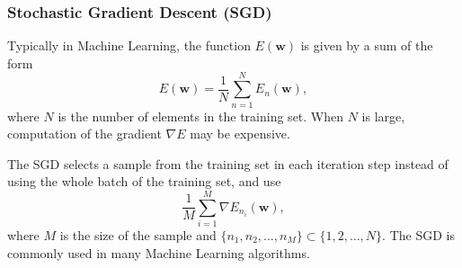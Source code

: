 \documentclass[
]{article}
\begin{document}
\hypertarget{stochastic-gradient-descent-sgd}{%
\subsubsection{Stochastic Gradient Descent
(SGD)}\label{stochastic-gradient-descent-sgd}}

Typically in Machine Learning, the function \(E({\boldsymbol{w}})\) is
given by a sum of the form
\[ E({\boldsymbol{w}}) = \frac 1 N \sum_{n=1}^N E_n({\boldsymbol{w}}), \]
where \(N\) is the number of elements in the training set. When \(N\) is
large, computation of the gradient \(\nabla E\) may be expensive.

The SGD selects a sample from the training set in each iteration step
instead of using the whole batch of the training set, and use
\[ \frac 1 M \sum_{i=1}^M \nabla E_{n_i}({\boldsymbol{w}}) ,\] where
\(M\) is the size of the sample and
\(\{ n_1, n_2 , \dots , n_M \} \subset \{ 1,2, \dots , N \}\). The SGD
is commonly used in many Machine Learning algorithms.
\end{document}
